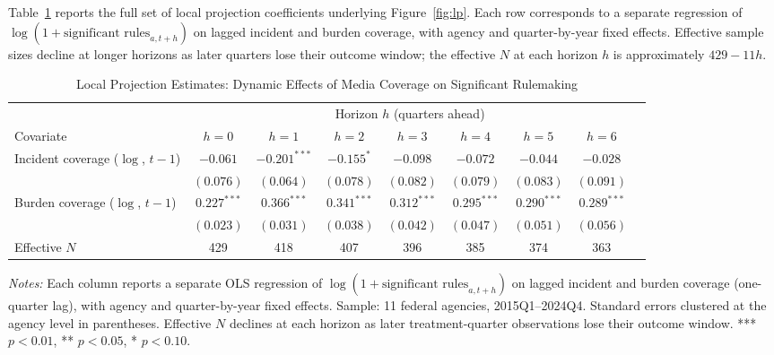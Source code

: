\documentclass[12pt]{article}
\begin{document}
Table~\ref{tab:lp} reports the full set of local projection coefficients underlying Figure~\ref{fig:lp}. Each row corresponds to a separate regression of $\log(1+\text{significant rules}_{a,t+h})$ on lagged incident and burden coverage, with agency and quarter-by-year fixed effects. Effective sample sizes decline at longer horizons as later quarters lose their outcome window; the effective $N$ at each horizon $h$ is approximately $429 - 11h$.

\begin{table}[H]
\centering
\caption{\label{tab:lp}Local Projection Estimates: Dynamic Effects of Media Coverage on Significant Rulemaking}
\begin{adjustbox}{max width=\textwidth}
\begin{threeparttable}
\begin{tabular}{lcccccccc}
\toprule
\multicolumn{1}{c}{ } & \multicolumn{7}{c}{Horizon $h$ (quarters ahead)} \\
\cmidrule(l{3pt}r{3pt}){2-8}
Covariate & $h=0$ & $h=1$ & $h=2$ & $h=3$ & $h=4$ & $h=5$ & $h=6$ \\
\midrule
Incident coverage ($\log$, $t-1$) & $-0.061$ & $-0.201^{***}$ & $-0.155^{*}$ & $-0.098$ & $-0.072$ & $-0.044$ & $-0.028$ \\
 & $(0.076)$ & $(0.064)$ & $(0.078)$ & $(0.082)$ & $(0.079)$ & $(0.083)$ & $(0.091)$ \\
Burden coverage ($\log$, $t-1$) & $0.227^{***}$ & $0.366^{***}$ & $0.341^{***}$ & $0.312^{***}$ & $0.295^{***}$ & $0.290^{***}$ & $0.289^{***}$ \\
 & $(0.023)$ & $(0.031)$ & $(0.038)$ & $(0.042)$ & $(0.047)$ & $(0.051)$ & $(0.056)$ \\
\addlinespace
Effective $N$ & 429 & 418 & 407 & 396 & 385 & 374 & 363 \\
\bottomrule
\end{tabular}
\begin{tablenotes}
\small
\item \textit{Notes:} Each column reports a separate OLS regression of $\log(1+\text{significant rules}_{a,t+h})$ on lagged incident and burden coverage (one-quarter lag), with agency and quarter-by-year fixed effects. Sample: 11 federal agencies, 2015Q1--2024Q4. Standard errors clustered at the agency level in parentheses. Effective $N$ declines at each horizon as later treatment-quarter observations lose their outcome window. *** $p<0.01$, ** $p<0.05$, * $p<0.10$.
\end{tablenotes}
\end{threeparttable}
\end{adjustbox}
\end{table}
\end{document}
